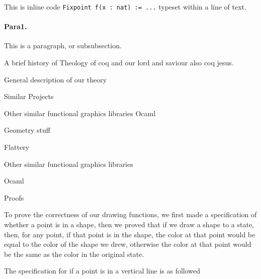 \documentclass{llncs}
\begin{document}
This is inline code \lstinline|Fixpoint f(x : nat) := ...| typeset within a line of text.



\paragraph{Para1.} This is a paragraph, or subsubsection.







\begin{section}{A brief history of Theology of coq and our lord and saviour also coq jesus.}\end{section}

\begin{section}{General description of our theory}\end{section}

\begin{section}{Similar Projects}\end{section}
\begin{subsection}{Other similar functional graphics libraries Ocaml}\end{subsection}
\begin{subsection}{Geometry stuff}\end{subsection}

\begin{subsection}{Flattery}\end{subsection}

\begin{subsection}{Other similar functional graphics libraries} \end{subsection} 

\begin{subsubsection}{Ocaml}\end{subsubsection}

\begin{section}{Proofs}\end{section}
To prove the correctness of our drawing functions, we first made a specification of whether a point is in a shape, then we proved that if we draw a shape to a state, then, for any point, if that point is in the shape, the color at that point would be equal to the color of the shape we drew, otherwise the color at that point would be the same as the color in the original state.

The specification for if a point is in a vertical line is as followed
\end{document}
